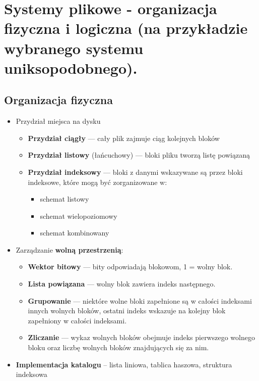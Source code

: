 \documentclass[main.tex]{subfiles}
\begin{document}
    \section{Systemy plikowe - organizacja fizyczna i logiczna (na przykładzie wybranego systemu uniksopodobnego).}

    \subsection{Organizacja fizyczna}
    \begin{itemize}[noitemsep]
        \item Przydział miejsca na dysku
        \begin{itemize}
            \item \textbf{Przydział ciągły} — cały plik zajmuje ciąg kolejnych bloków
            \item \textbf{Przydział listowy} (łańcuchowy) — bloki pliku tworzą listę powiązaną
            \item \textbf{Przydział indeksowy} — bloki z danymi wskazywane są przez bloki indeksowe, które mogą być
            zorganizowane w:
            \begin{itemize}[noitemsep]
                \item schemat listowy
                \item schemat wielopoziomowy
                \item schemat kombinowany
            \end{itemize}
        \end{itemize}
        \item Zarządzanie \textbf{wolną przestrzenią}:
        \begin{itemize}[noitemsep]
            \item \textbf{Wektor bitowy} — bity odpowiadają blokowom, 1 = wolny blok.
            \item \textbf{Lista powiązana} — wolny blok zawiera indeks następnego.
            \item \textbf{Grupowanie} — niektóre wolne bloki zapełnione są w całości indeksami innych wolnych bloków,
            ostatni indeks wskazuje na kolejny blok zapełniony w całości indeksami.
            \item \textbf{Zliczanie} — wykaz wolnych bloków obejmuje indeks pierwszego wolnego bloku oraz liczbę
            wolnych bloków znajdujących się za nim.
        \end{itemize}
        \item \textbf{Implementacja katalogu} – lista liniowa, tablica haszowa, struktura indeksowa
    \end{itemize}
\end{document}
